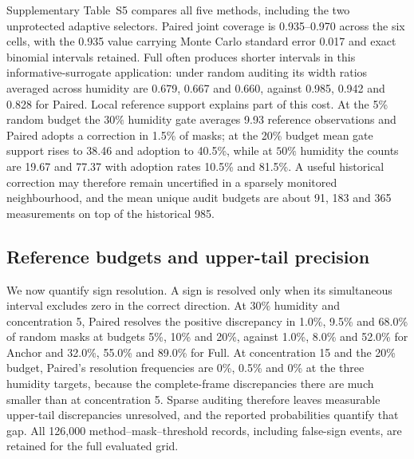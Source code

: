 Supplementary Table~S5 compares all five methods, including the two unprotected adaptive selectors. Paired joint coverage is 0.935--0.970 across the six cells, with the 0.935 value carrying Monte Carlo standard error 0.017 and exact binomial intervals retained. Full often produces shorter intervals in this informative-surrogate application: under random auditing its width ratios averaged across humidity are 0.679, 0.667 and 0.660, against 0.985, 0.942 and 0.828 for Paired. Local reference support explains part of this cost. At the 5\% random budget the $30\%$ humidity gate averages 9.93 reference observations and Paired adopts a correction in 1.5\% of masks; at the 20\% budget mean gate support rises to 38.46 and adoption to 40.5\%, while at $50\%$ humidity the counts are 19.67 and 77.37 with adoption rates 10.5\% and 81.5\%. A useful historical correction may therefore remain uncertified in a sparsely monitored neighbourhood, and the mean unique audit budgets are about 91, 183 and 365 measurements on top of the historical 985.

\subsection{Reference budgets and upper-tail precision}
We now quantify sign resolution. A sign is resolved only when its simultaneous interval excludes zero in the correct direction. At $30\%$ humidity and concentration 5, Paired resolves the positive discrepancy in 1.0\%, 9.5\% and 68.0\% of random masks at budgets 5\%, 10\% and 20\%, against 1.0\%, 8.0\% and 52.0\% for Anchor and 32.0\%, 55.0\% and 89.0\% for Full. At concentration 15 and the 20\% budget, Paired's resolution frequencies are 0\%, 0.5\% and 0\% at the three humidity targets, because the complete-frame discrepancies there are much smaller than at concentration 5. Sparse auditing therefore leaves measurable upper-tail discrepancies unresolved, and the reported probabilities quantify that gap. All 126,000 method--mask--threshold records, including false-sign events, are retained for the full evaluated grid.



